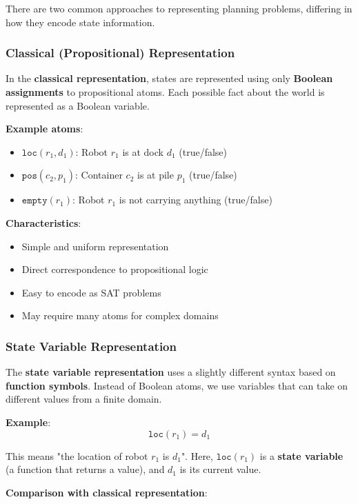 \documentclass[11pt,a4paper]{article}
\theoremstyle{definition}
\theoremstyle{plain}
\theoremstyle{remark}
\begin{document}
There are two common approaches to representing planning problems, differing in how they encode state information.

\subsubsection{Classical (Propositional) Representation}

In the \textbf{classical representation}, states are represented using only \textbf{Boolean assignments} to propositional atoms. Each possible fact about the world is represented as a Boolean variable.

\textbf{Example atoms}:
\begin{itemize}
    \item $\texttt{loc}(r_1, d_1)$: Robot $r_1$ is at dock $d_1$ (true/false)
    \item $\texttt{pos}(c_2, p_1)$: Container $c_2$ is at pile $p_1$ (true/false)
    \item $\texttt{empty}(r_1)$: Robot $r_1$ is not carrying anything (true/false)
\end{itemize}

\textbf{Characteristics}:
\begin{itemize}
    \item Simple and uniform representation
    \item Direct correspondence to propositional logic
    \item Easy to encode as SAT problems
    \item May require many atoms for complex domains
\end{itemize}

\subsubsection{State Variable Representation}

The \textbf{state variable representation} uses a slightly different syntax based on \textbf{function symbols}. Instead of Boolean atoms, we use variables that can take on different values from a finite domain.

\textbf{Example}:
\[
\texttt{loc}(r_1) = d_1
\]

This means "the location of robot $r_1$ is $d_1$". Here, $\texttt{loc}(r_1)$ is a \textbf{state variable} (a function that returns a value), and $d_1$ is its current value.

\textbf{Comparison with classical representation}:
\end{document}
